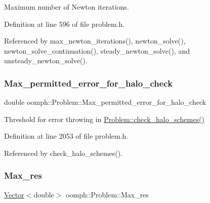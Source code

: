Maximum number of Newton iterations. 



Definition at line 596 of file problem.\+h.



Referenced by max\+\_\+newton\+\_\+iterations(), newton\+\_\+solve(), newton\+\_\+solve\+\_\+continuation(), steady\+\_\+newton\+\_\+solve(), and unsteady\+\_\+newton\+\_\+solve().

\mbox{\label{classoomph_1_1Problem_aeadae1fc5f49e66223ee09c69a9e506d}} 
\subsubsection{\texorpdfstring{Max\+\_\+permitted\+\_\+error\+\_\+for\+\_\+halo\+\_\+check}{Max\_permitted\_error\_for\_halo\_check}}
{\footnotesize\ttfamily double oomph\+::\+Problem\+::\+Max\+\_\+permitted\+\_\+error\+\_\+for\+\_\+halo\+\_\+check}



Threshold for error throwing in \hyperlink{classoomph_1_1Problem_a8dd5cb241ce6218fb476931e0879d7c8}{Problem\+::check\+\_\+halo\+\_\+schemes()} 



Definition at line 2053 of file problem.\+h.



Referenced by check\+\_\+halo\+\_\+schemes().

\mbox{\label{classoomph_1_1Problem_ab6f510bea9bdfcaf229415440a0a1c98}} 
\subsubsection{\texorpdfstring{Max\+\_\+res}{Max\_res}}
{\footnotesize\ttfamily \hyperlink{classoomph_1_1Vector}{Vector}$<$double$>$ oomph\+::\+Problem\+::\+Max\+\_\+res\hspace{0.3cm}{\ttfamily [protected]}}



